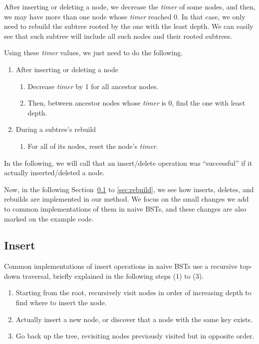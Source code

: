 \documentclass{article}
\begin{document}
After inserting or deleting a node, we decrease the \emph{timer} of some nodes, and then, we may have more than one node whose \emph{timer} reached 0. In that case, we only need to rebuild the subtree rooted by the one with the least depth. We can easily see that such subtree will include all such nodes and their rooted subtrees.

Using these \emph{timer} values, we just need to do the following.
\begin{enumerate}[$\bullet$]
    \item After inserting or deleting a node
    \begin{enumerate}[--]
        \item Decrease \emph{timer} by 1 for all ancestor nodes.
        \item Then, between ancestor nodes whose \emph{timer} is 0, find the one with least depth.
    \end{enumerate}
    \item During a subtree's rebuild
    \begin{enumerate}[--]
        \item For all of its nodes, reset the node's \emph{timer}.
    \end{enumerate}
\end{enumerate}

In the following, we will call that an insert/delete operation was ``successful'' if it actually inserted/deleted a node.

Now, in the following Section~\ref{sec:insert} to \ref{sec:rebuild}, we see how inserts, deletes, and rebuilds are implemented in our method. We focus on the small changes we add to common implementations of them in naive BSTs, and these changes are also marked on the example code.
\subsection {Insert}\label{sec:insert}
Common implementations of insert operations in naive BSTs use a recursive top-down traversal, briefly explained in the following steps (1) to (3).
\begin{enumerate}[(1)]
 \item Starting from the root, recursively visit nodes in order of increasing depth to find where to insert the node.
 \item Actually insert a new node, or discover that a node with the same key exists.
 \item Go back up the tree, revisiting nodes previously visited but in opposite order.
\end{enumerate}
\end{document}
